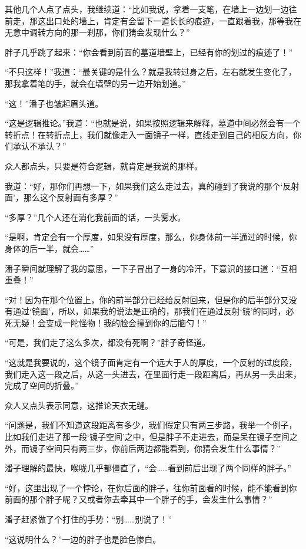 其他几个人点了点头，我继续道：“比如我说，拿着一支笔，在墙上一边划一边往前走，那这出口处的墙上，肯定有会留下一道长长的痕迹，一直跟着我，那等我在无意中调转方向的那一刹那，你们猜会发现什么？”

胖子几乎跳了起来：“你会看到前面的墓道墙壁上，已经有你的划过的痕迹了！”

“不只这样！”我道：“最关键的是什么？就是我转过身之后，左右就发生变化了，那我拿着笔的手，就会在墙壁的另一边开始划道。”

“这！”潘子也皱起眉头道。

“这是逻辑推论。”我道：“也就是说，如果按照逻辑来解释，墓道中间必然会有一个转折点！在转折点上，我们就像走入一面镜子一样，直线走到自己的相反方向，你们承认不承认？”

众人都点头，只要是符合逻辑，就肯定是我说的那样。

我道：“好，那你们再想一下，如果我们这么走过去，真的碰到了我说的那个‘反射面’，那么这个反射面有多厚？”

“多厚？”几个人还在消化我前面的话，一头雾水。

“是啊，肯定会有一个厚度，如果没有厚度，那么，你身体前一半通过的时候，你身体的后一半，就会……”

潘子瞬间就理解了我的意思，一下子冒出了一身的冷汗，下意识的接口道：“互相重叠！”

“对！因为在那个位置上，你的前半部分已经给反射回来，但是你的后半部分又没有通过‘镜面’，所以，如果我的说法是正确的，那我们在通过反射‘镜’的同时，必死无疑！会变成一陀怪物！我的脸会撞到你的后脑勺！”

“可是，我们走了这么多次，都没有死啊？”胖子奇怪道。

“这就是我要说的，这个镜子面肯定有一个远大于人的厚度，一个反射的过度段，我们走入这一段之后，从这一头进去，在里面行走一段距离后，再从另一头出来，完成了空间的折叠。”

众人又点头表示同意，这推论天衣无缝。

“问题是，我们不知道这段距离有多少，我们假定只有两三步路，我举一个例子，比如我们走进了那一段‘镜子空间’之中，但是胖子不走进去，而是呆在镜子空间之外，而镜子空间只有两三步，你前后两边都能看到，你猜会发生什么事情？”

潘子理解的最快，喉咙几乎都僵直了，“会……看到前后出现了两个同样的胖子。”

“好，这里出现了一个悖论，在你后面的胖子，往你前面看的时候，能不能看到你前面的那个胖子呢？又或者你去牵其中一个胖子的手，会发生什么事情？”

潘子赶紧做了个打住的手势：“别……别说了！”

“这说明什么？”一边的胖子也是脸色惨白。

